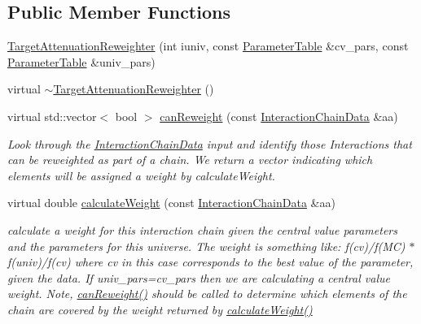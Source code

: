 \subsection*{Public Member Functions}
\begin{DoxyCompactItemize}
\item 
\hyperlink{class_neutrino_flux_reweight_1_1_target_attenuation_reweighter_a4bdac10057844c185c68a6126c85b29a}{Target\-Attenuation\-Reweighter} (int iuniv, const \hyperlink{class_neutrino_flux_reweight_1_1_parameter_table}{Parameter\-Table} \&cv\-\_\-pars, const \hyperlink{class_neutrino_flux_reweight_1_1_parameter_table}{Parameter\-Table} \&univ\-\_\-pars)
\item 
virtual \hyperlink{class_neutrino_flux_reweight_1_1_target_attenuation_reweighter_a00969fcc70150ea19dce58799742c8ca}{$\sim$\-Target\-Attenuation\-Reweighter} ()
\item 
virtual std\-::vector$<$ bool $>$ \hyperlink{class_neutrino_flux_reweight_1_1_target_attenuation_reweighter_a99789f168f16b45ebf5b02dad6f86cb5}{can\-Reweight} (const \hyperlink{class_neutrino_flux_reweight_1_1_interaction_chain_data}{Interaction\-Chain\-Data} \&aa)
\begin{DoxyCompactList}\small\item\em Look through the \hyperlink{class_neutrino_flux_reweight_1_1_interaction_chain_data}{Interaction\-Chain\-Data} input and identify those Interactions that can be reweighted as part of a chain. We return a vector indicating which elements will be assigned a weight by calculate\-Weight. \end{DoxyCompactList}\item 
virtual double \hyperlink{class_neutrino_flux_reweight_1_1_target_attenuation_reweighter_a58691aeda33f770a28cd27f677ae790f}{calculate\-Weight} (const \hyperlink{class_neutrino_flux_reweight_1_1_interaction_chain_data}{Interaction\-Chain\-Data} \&aa)
\begin{DoxyCompactList}\small\item\em calculate a weight for this interaction chain given the central value parameters and the parameters for this universe. The weight is something like\-: f(cv)/f(M\-C) $\ast$ f(univ)/f(cv) where cv in this case corresponds to the best value of the parameter, given the data. If univ\-\_\-pars=cv\-\_\-pars then we are calculating a central value weight. Note, \hyperlink{class_neutrino_flux_reweight_1_1_target_attenuation_reweighter_a99789f168f16b45ebf5b02dad6f86cb5}{can\-Reweight()} should be called to determine which elements of the chain are covered by the weight returned by \hyperlink{class_neutrino_flux_reweight_1_1_target_attenuation_reweighter_a58691aeda33f770a28cd27f677ae790f}{calculate\-Weight()} \end{DoxyCompactList}\end{DoxyCompactItemize}
